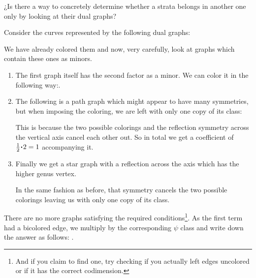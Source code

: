 \documentclass[12pt]{memoir}
\begin{document}
\begin{Qn}
    ¿Is there a way to concretely determine whether a strata belongs in another one only by looking at their dual graphs?
\end{Qn}

\begin{Ex}[\((4,0)\) instead of \((0,4)\)]
    Consider the curves represented by the following dual graphs:\par
    We have already colored them and now, very carefully, look at graphs which contain these ones as minors.
    \begin{enumerate}
        \item The first graph itself has the second factor as a minor. We can color it in the following way:.
        \item The following is a path graph which might appear to have many symmetries, but when imposing the coloring, we are left with only one copy of its class: \par
              This is because the two possible colorings and the reflection symmetry across the vertical axis cancel each other out. So in total we get a coefficient of \(\half\.2=1\) accompanying it.
        \item Finally we get a star graph with a reflection across the axis which has the higher genus vertex.\par
              In the same fashion as before, that symmetry cancels the two possible colorings leaving us with only one copy of its class.
    \end{enumerate}
    There are no more graphs satisfying the required conditions\footnote{And if you claim to find one, try checking if you actually left edges uncolored or if it has the correct codimension.}. As the first term had a bicolored edge, we multiply by the corresponding \(\psi\) class and write down the answer as follows: .
\end{Ex}
\end{document}
